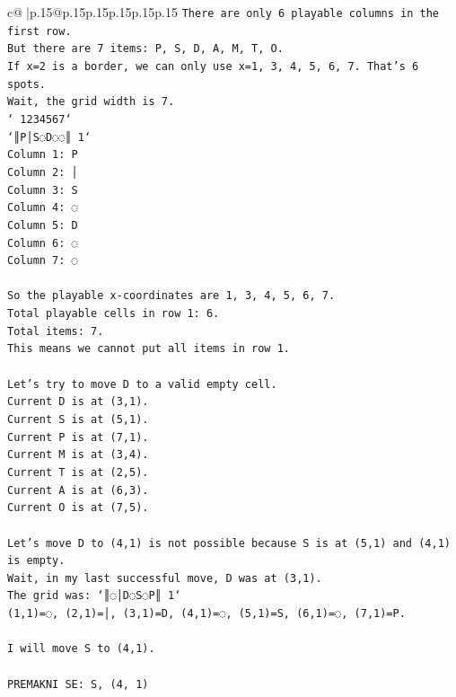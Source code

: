 \documentclass{article}
\begin{document}
{\begin{supertabular}{c@{$\;$}|p{.15\linewidth}@{}p{.15\linewidth}p{.15\linewidth}p{.15\linewidth}p{.15\linewidth}p{.15\linewidth}}
{{{\texttt{There are only 6 playable columns in the first row.} \\
\texttt{But there are 7 items: P, S, D, A, M, T, O.} \\
\texttt{If x=2 is a border, we can only use x=1, 3, 4, 5, 6, 7. That's 6 spots.} \\
\texttt{Wait, the grid width is 7.} \\
\texttt{` 1234567`} \\
\texttt{`║P│S◌D◌◌║ 1`} \\
\texttt{Column 1: P} \\
\texttt{Column 2: │} \\
\texttt{Column 3: S} \\
\texttt{Column 4: ◌} \\
\texttt{Column 5: D} \\
\texttt{Column 6: ◌} \\
\texttt{Column 7: ◌} \\
\\ 
\texttt{So the playable x{-}coordinates are 1, 3, 4, 5, 6, 7.} \\
\texttt{Total playable cells in row 1: 6.} \\
\texttt{Total items: 7.} \\
\texttt{This means we cannot put all items in row 1.} \\
\\ 
\texttt{Let's try to move D to a valid empty cell.} \\
\texttt{Current D is at (3,1).} \\
\texttt{Current S is at (5,1).} \\
\texttt{Current P is at (7,1).} \\
\texttt{Current M is at (3,4).} \\
\texttt{Current T is at (2,5).} \\
\texttt{Current A is at (6,3).} \\
\texttt{Current O is at (7,5).} \\
\\ 
\texttt{Let's move D to (4,1) is not possible because S is at (5,1) and (4,1) is empty.} \\
\texttt{Wait, in my last successful move, D was at (3,1).} \\
\texttt{The grid was: `║◌│D◌S◌P║ 1`} \\
\texttt{(1,1)=◌, (2,1)=│, (3,1)=D, (4,1)=◌, (5,1)=S, (6,1)=◌, (7,1)=P.} \\
\\ 
\texttt{I will move S to (4,1).} \\
\\ 
\texttt{PREMAKNI SE: S, (4, 1)} \\
            }
        }
    }
     \\ \\


\end{supertabular}}
\end{document}
